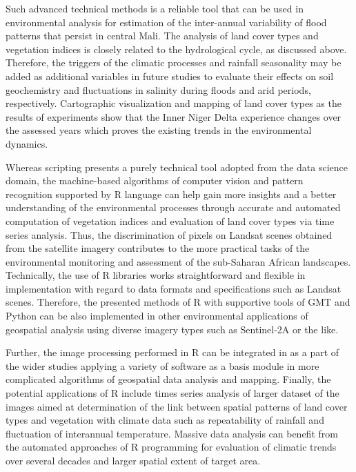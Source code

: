 \documentclass[12pt,a4paper,oneside]{article}
\def \newpar{\vspace{6pt}}
\begin{document}
\newpar Such advanced technical methods is a reliable tool that can be used in environmental analysis for estimation of the inter-annual variability of flood patterns that persist in central Mali. The analysis of land cover types and vegetation indices is closely related to the hydrological cycle, as discussed above. Therefore, the triggers of the climatic processes and rainfall seasonality may be added as additional variables in future studies to evaluate their effects on soil geochemistry and fluctuations in salinity during floods and arid periods, respectively. Cartographic visualization and mapping of land cover types as the results of experiments show that the Inner Niger Delta experience changes over the assessed years which proves the existing trends in the environmental dynamics.  

\newpar Whereas scripting presents a purely technical tool adopted from the data science domain, the machine-based algorithms of computer vision and pattern recognition supported by R language can help gain more insights and a better understanding of the environmental processes through accurate and automated computation of vegetation indices and evaluation of land cover types via time series analysis. Thus, the discrimination of pixels on Landsat scenes obtained from the satellite imagery contributes to the more practical tasks of the environmental monitoring and assessment of the sub-Saharan African landscapes. Technically, the use of R libraries works straightforward and flexible in implementation with regard to data formats and specifications such as Landsat scenes. Therefore, the presented methods of R with supportive tools of GMT and Python can be also implemented in other environmental applications of geospatial analysis using diverse imagery types such as Sentinel-2A or the like. 

\newpar Further, the image processing performed in R can be integrated in as a part of the wider studies applying a variety of software as a basis module in more complicated algorithms of geospatial data analysis and mapping. Finally, the potential applications of R include times series analysis of larger dataset of the images aimed at determination of the link between spatial patterns of land cover types and vegetation with climate data such as repeatability of rainfall and fluctuation of interannual temperature. Massive data analysis can benefit from the automated approaches of R programming for evaluation of climatic trends over several decades and larger spatial extent of target area.
\end{document}
